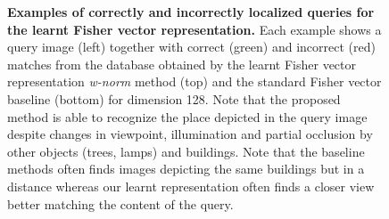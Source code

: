 \documentclass[10pt,twocolumn,letterpaper]{article}
\begin{document}
         \begin{figure}
            
            \caption{
                \textbf{Examples of correctly and incorrectly localized queries for the learnt Fisher vector representation.}
                Each example shows a query image (left) together with correct (green) and incorrect (red) matches from the database obtained by the learnt Fisher vector representation \emph{w-norm} method (top) and the standard Fisher vector baseline (bottom) for dimension 128. Note that the proposed method is able to recognize the place depicted in the query image despite changes in viewpoint, illumination and partial occlusion by other objects (trees, lamps) and buildings. 
                Note that the baseline methods often finds images depicting the same buildings but in a distance whereas our learnt representation often finds a closer view better matching the content of the query.       
            }
            \label{fig:images}
         \end{figure}
\end{document}
